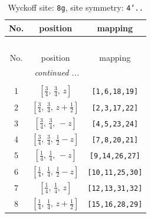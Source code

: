 \documentclass[fleqn,8pt]{jsarticle}
\begin{document}
\begin{longtable}{ccc}
\caption{Wyckoff site: {\tt 8g}, site symmetry: {\tt 4'..}}
 \\
 \hline \hline
No. & position & mapping \\ \hline \endfirsthead

\multicolumn{2}{l}{\tablename\ \thetable{}} \\
 \hline \hline
No. & position & mapping \\ \hline \endhead

 \hline \hline
\multicolumn{2}{r}{\footnotesize\it continued ...} \\ \endfoot

 \hline \hline
\multicolumn{2}{r}{} \\ \endlastfoot

1 & $\left[ \frac{3}{4},\, \frac{3}{4},\, z \right]$ & {\tt [1,6,18,19]} \\ \hline
2 & $\left[ \frac{3}{4},\, \frac{3}{4},\, z + \frac{1}{2} \right]$ & {\tt [2,3,17,22]} \\ \hline
3 & $\left[ \frac{3}{4},\, \frac{3}{4},\, - z \right]$ & {\tt [4,5,23,24]} \\ \hline
4 & $\left[ \frac{3}{4},\, \frac{3}{4},\, \frac{1}{2} - z \right]$ & {\tt [7,8,20,21]} \\ \hline
5 & $\left[ \frac{1}{4},\, \frac{1}{4},\, - z \right]$ & {\tt [9,14,26,27]} \\ \hline
6 & $\left[ \frac{1}{4},\, \frac{1}{4},\, \frac{1}{2} - z \right]$ & {\tt [10,11,25,30]} \\ \hline
7 & $\left[ \frac{1}{4},\, \frac{1}{4},\, z \right]$ & {\tt [12,13,31,32]} \\ \hline
8 & $\left[ \frac{1}{4},\, \frac{1}{4},\, z + \frac{1}{2} \right]$ & {\tt [15,16,28,29]} \\
\end{longtable}
\renewcommand{\arraystretch}{1.2}
\end{document}
